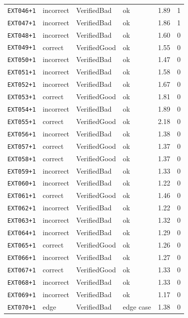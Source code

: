 \begin{longtable}{@{}l l l l r r@{}}
\texttt{EXT046{+}1} & incorrect & VerifiedBad & ok & 1.89 & 1 \\
\texttt{EXT047{+}1} & incorrect & VerifiedBad & ok & 1.86 & 1 \\
\texttt{EXT048{+}1} & incorrect & VerifiedBad & ok & 1.60 & 0 \\
\texttt{EXT049{+}1} & correct & VerifiedGood & ok & 1.55 & 0 \\
\texttt{EXT050{+}1} & incorrect & VerifiedBad & ok & 1.47 & 0 \\
\texttt{EXT051{+}1} & incorrect & VerifiedBad & ok & 1.58 & 0 \\
\texttt{EXT052{+}1} & incorrect & VerifiedBad & ok & 1.67 & 0 \\
\texttt{EXT053{+}1} & correct & VerifiedGood & ok & 1.81 & 0 \\
\texttt{EXT054{+}1} & incorrect & VerifiedBad & ok & 1.89 & 0 \\
\texttt{EXT055{+}1} & correct & VerifiedGood & ok & 2.18 & 0 \\
\texttt{EXT056{+}1} & incorrect & VerifiedBad & ok & 1.38 & 0 \\
\texttt{EXT057{+}1} & correct & VerifiedGood & ok & 1.37 & 0 \\
\texttt{EXT058{+}1} & correct & VerifiedGood & ok & 1.37 & 0 \\
\texttt{EXT059{+}1} & incorrect & VerifiedBad & ok & 1.33 & 0 \\
\texttt{EXT060{+}1} & incorrect & VerifiedBad & ok & 1.22 & 0 \\
\texttt{EXT061{+}1} & correct & VerifiedGood & ok & 1.46 & 0 \\
\texttt{EXT062{+}1} & incorrect & VerifiedBad & ok & 1.22 & 0 \\
\texttt{EXT063{+}1} & incorrect & VerifiedBad & ok & 1.32 & 0 \\
\texttt{EXT064{+}1} & incorrect & VerifiedBad & ok & 1.29 & 0 \\
\texttt{EXT065{+}1} & correct & VerifiedGood & ok & 1.26 & 0 \\
\texttt{EXT066{+}1} & incorrect & VerifiedBad & ok & 1.27 & 0 \\
\texttt{EXT067{+}1} & correct & VerifiedGood & ok & 1.33 & 0 \\
\texttt{EXT068{+}1} & incorrect & VerifiedBad & ok & 1.33 & 0 \\
\texttt{EXT069{+}1} & incorrect & VerifiedBad & ok & 1.17 & 0 \\
\texttt{EXT070{+}1} & edge & VerifiedBad & edge case & 1.38 & 0 \\

\end{longtable}
